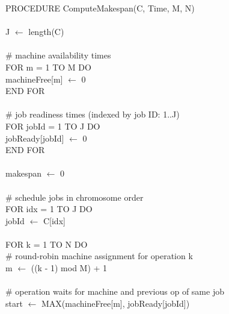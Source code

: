 \documentclass[10pt,twocolumn]{article}
\begin{document}
{\small\ttfamily
PROCEDURE ComputeMakespan(C, Time, M, N)\\
\\
\hspace*{5pt}J $\leftarrow$ length(C)\\
\\
\hspace*{5pt}\# machine availability times\\
\hspace*{5pt}FOR m = 1 TO M DO\\
\hspace*{10pt}machineFree[m] $\leftarrow$ 0\\
\hspace*{5pt}END FOR\\
\\
\hspace*{5pt}\# job readiness times (indexed by job ID: 1..J)\\
\hspace*{5pt}FOR jobId = 1 TO J DO\\
\hspace*{10pt}jobReady[jobId] $\leftarrow$ 0\\
\hspace*{5pt}END FOR\\
\\
\hspace*{5pt}makespan $\leftarrow$ 0\\
\\
\hspace*{5pt}\# schedule jobs in chromosome order\\
\hspace*{5pt}FOR idx = 1 TO J DO\\
\hspace*{10pt}jobId $\leftarrow$ C[idx]\\
\\
\hspace*{10pt}FOR k = 1 TO N DO\\
\hspace*{15pt}\# round-robin machine assignment for operation k\\
\hspace*{15pt}m $\leftarrow$ ((k - 1) mod M) + 1\\
\\
\hspace*{15pt}\# operation waits for machine and previous op of same job\\
\hspace*{15pt}start $\leftarrow$ MAX(machineFree[m], jobReady[jobId])\\
}
\end{document}

